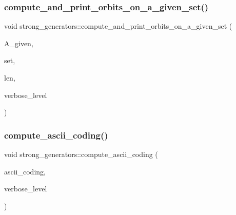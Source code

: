 \subsubsection{\texorpdfstring{compute\+\_\+and\+\_\+print\+\_\+orbits\+\_\+on\+\_\+a\+\_\+given\+\_\+set()}{compute\_and\_print\_orbits\_on\_a\_given\_set()}}
{\footnotesize\ttfamily void strong\+\_\+generators\+::compute\+\_\+and\+\_\+print\+\_\+orbits\+\_\+on\+\_\+a\+\_\+given\+\_\+set (\begin{DoxyParamCaption}\item[{\mbox{\hyperlink{classaction}{action}} $\ast$}]{A\+\_\+given,  }\item[{\mbox{\hyperlink{galois_8h_a09fddde158a3a20bd2dcadb609de11dc}{I\+NT}} $\ast$}]{set,  }\item[{\mbox{\hyperlink{galois_8h_a09fddde158a3a20bd2dcadb609de11dc}{I\+NT}}}]{len,  }\item[{\mbox{\hyperlink{galois_8h_a09fddde158a3a20bd2dcadb609de11dc}{I\+NT}}}]{verbose\+\_\+level }\end{DoxyParamCaption})}

\mbox{\label{classstrong__generators_aa3b81051f6c52b43b7ff188e22a9da6b}} 
\subsubsection{\texorpdfstring{compute\+\_\+ascii\+\_\+coding()}{compute\_ascii\_coding()}}
{\footnotesize\ttfamily void strong\+\_\+generators\+::compute\+\_\+ascii\+\_\+coding (\begin{DoxyParamCaption}\item[{\mbox{\hyperlink{galois_8h_ab6cc7b4aeb6ea31aba2b3fbfc83ff5e6}{B\+Y\+TE}} $\ast$\&}]{ascii\+\_\+coding,  }\item[{\mbox{\hyperlink{galois_8h_a09fddde158a3a20bd2dcadb609de11dc}{I\+NT}}}]{verbose\+\_\+level }\end{DoxyParamCaption})}

\mbox{\label{classstrong__generators_a4124e0060db9e45c8f698c9fab00d946}} 
